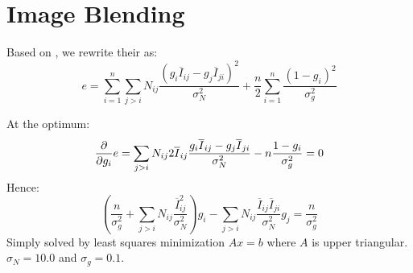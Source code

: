 \section{Image Blending}
Based on \cite{IJCV2007_MatthewBrown_AutomaticPanoramicImage}, we rewrite their  as:
$$e=\sum_{i=1}^n \sum_{j>i} N_{ij} \dfrac{(g_i \overline{I}_{ij} -g_j \overline{I}_{ji})^2}{\sigma_N^2} + \dfrac{n}{2} \sum_{i=1}^n \dfrac{(1-g_i)^2}{\sigma_g^2}$$

At the optimum:
$$\deriv{e}{g_i}=\sum_{j>i} N_{ij} 2 \overline{I}_{ij} \dfrac{g_i \overline{I}_{ij} -g_j \overline{I}_{ji}}{\sigma_N^2} - n \dfrac{1-g_i}{\sigma_g^2}=0$$
Hence:
$$\left( \dfrac{n}{\sigma_g^2} + \sum_{j>i} N_{ij}  \dfrac{\overline{I}_{ij}^2}{\sigma_N^2} \right) g_i -\sum_{j>i} N_{ij} \dfrac{\overline{I}_{ij} \overline{I}_{ji}}{\sigma_N^2}g_j = \dfrac{n}{\sigma_g^2}$$
Simply solved by least squares minimization $Ax=b$ where $A$ is upper triangular. $\sigma_N=10.0$ and $\sigma_g=0.1$.